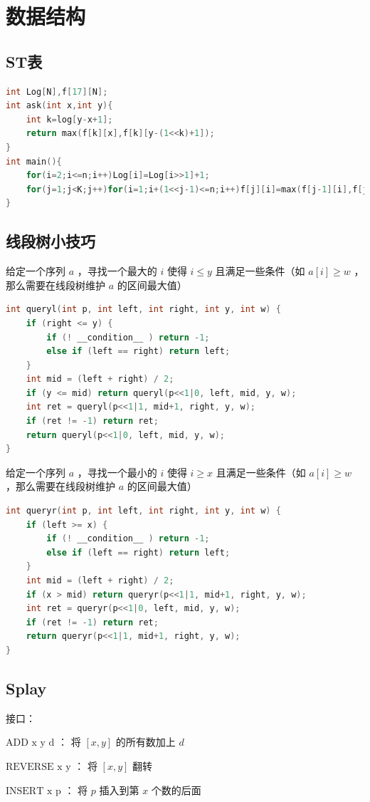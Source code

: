 \documentclass{article}
\begin{document}
\section{数据结构}
\subsection{ST表}
\begin{lstlisting}[language=C++]
int Log[N],f[17][N];
int ask(int x,int y){
	int k=log[y-x+1];
	return max(f[k][x],f[k][y-(1<<k)+1]);
}
int main(){
	for(i=2;i<=n;i++)Log[i]=Log[i>>1]+1;
	for(j=1;j<K;j++)for(i=1;i+(1<<j-1)<=n;i++)f[j][i]=max(f[j-1][i],f[j-1][i+(1<<j-1)]);
}
\end{lstlisting}
\subsection{线段树小技巧}
给定一个序列 $a$ ，寻找一个最大的 $i$ 使得 $i \leq y$ 且满足一些条件（如 $a[i] \geq w$ ，那么需要在线段树维护 $a$ 的区间最大值）
\begin{lstlisting}[language=C++]
int queryl(int p, int left, int right, int y, int w) {
	if (right <= y) {
		if (! __condition__ ) return -1;
		else if (left == right) return left;
	}
	int mid = (left + right) / 2;
	if (y <= mid) return queryl(p<<1|0, left, mid, y, w);
	int ret = queryl(p<<1|1, mid+1, right, y, w);
	if (ret != -1) return ret;
	return queryl(p<<1|0, left, mid, y, w);
}
\end{lstlisting}
给定一个序列 $a$ ，寻找一个最小的 $i$ 使得 $i \geq x$ 且满足一些条件（如 $a[i] \geq w$ ，那么需要在线段树维护 $a$ 的区间最大值）
\begin{lstlisting}[language=C++]
int queryr(int p, int left, int right, int y, int w) {
	if (left >= x) {
		if (! __condition__ ) return -1;
		else if (left == right) return left;
	}
	int mid = (left + right) / 2;
	if (x > mid) return queryr(p<<1|1, mid+1, right, y, w);
	int ret = queryr(p<<1|0, left, mid, y, w);
	if (ret != -1) return ret;
	return queryr(p<<1|1, mid+1, right, y, w);
}
\end{lstlisting}
\subsection{Splay}
接口： 

$\text{ADD x y d}$ ： 将 $[x, y]$ 的所有数加上 $d$ 

$\text{REVERSE x y}$ ： 将 $[x, y]$ 翻转 

$\text{INSERT x p}$ ： 将 $p$ 插入到第 $x$ 个数的后面 
\end{document}
